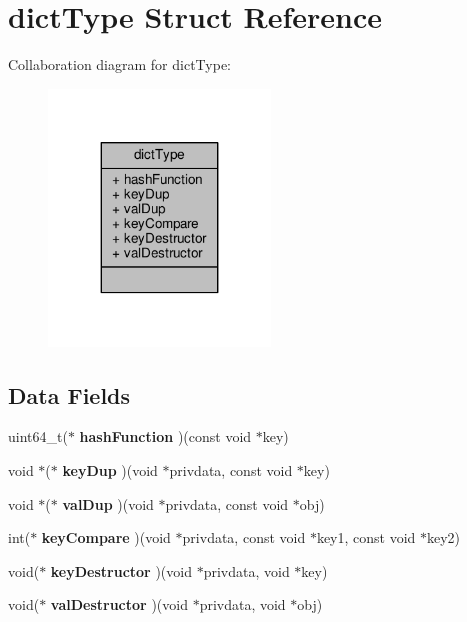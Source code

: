 \hypertarget{structdictType}{}\section{dict\+Type Struct Reference}
\label{structdictType}


Collaboration diagram for dict\+Type\+:\nopagebreak
\begin{figure}[H]
\begin{center}
\leavevmode
\includegraphics[width=167pt]{structdictType__coll__graph}
\end{center}
\end{figure}
\subsection*{Data Fields}
\begin{DoxyCompactItemize}
\item 
\mbox{\label{structdictType_a5163c6331e157f62a678cf30d7c7e334}} 
uint64\+\_\+t($\ast$ {\bfseries hash\+Function} )(const void $\ast$key)
\item 
\mbox{\label{structdictType_a9addb7c29c6082073a17743b44b0d563}} 
void $\ast$($\ast$ {\bfseries key\+Dup} )(void $\ast$privdata, const void $\ast$key)
\item 
\mbox{\label{structdictType_ad9752f0251c3121b2fc96be02383eee2}} 
void $\ast$($\ast$ {\bfseries val\+Dup} )(void $\ast$privdata, const void $\ast$obj)
\item 
\mbox{\label{structdictType_abc4e87fe80173aa50732c049d3be96b5}} 
int($\ast$ {\bfseries key\+Compare} )(void $\ast$privdata, const void $\ast$key1, const void $\ast$key2)
\item 
\mbox{\label{structdictType_a448ee05f531f872a05a2cdafccb5ecc4}} 
void($\ast$ {\bfseries key\+Destructor} )(void $\ast$privdata, void $\ast$key)
\item 
\mbox{\label{structdictType_a491b1283bac257f1573e38479131b18f}} 
void($\ast$ {\bfseries val\+Destructor} )(void $\ast$privdata, void $\ast$obj)
\end{DoxyCompactItemize}


